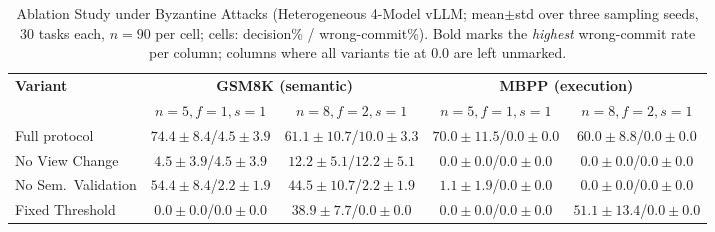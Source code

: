 \documentclass{article}
\begin{document}
\begin{table}[htbp]
\centering
\caption{Ablation Study under Byzantine Attacks (Heterogeneous 4-Model vLLM; mean$\pm$std over three sampling seeds, 30 tasks each, $n{=}90$ per cell; cells: decision\% / wrong-commit\%). Bold marks the \emph{highest} wrong-commit rate per column; columns where all variants tie at $0.0$ are left unmarked.}
\label{tab:ablation}
\setlength{\tabcolsep}{2pt}
\footnotesize
\begin{tabular}{lcccc}
\toprule
\textbf{Variant} & \multicolumn{2}{c}{\textbf{GSM8K (semantic)}} & \multicolumn{2}{c}{\textbf{MBPP (execution)}} \\
\cmidrule(lr){2-3} \cmidrule(lr){4-5}
 & $n{=}5,f{=}1,s{=}1$ & $n{=}8,f{=}2,s{=}1$ & $n{=}5,f{=}1,s{=}1$ & $n{=}8,f{=}2,s{=}1$ \\
\midrule
Full protocol & $74.4{\pm}8.4$/$\mathbf{4.5{\pm}3.9}$ & $61.1{\pm}10.7$/$10.0{\pm}3.3$ & $70.0{\pm}11.5$/$0.0{\pm}0.0$ & $60.0{\pm}8.8$/$0.0{\pm}0.0$ \\
No View Change & $4.5{\pm}3.9$/$\mathbf{4.5{\pm}3.9}$ & $12.2{\pm}5.1$/$\mathbf{12.2{\pm}5.1}$ & $0.0{\pm}0.0$/$0.0{\pm}0.0$ & $0.0{\pm}0.0$/$0.0{\pm}0.0$ \\
No Sem.\ Validation & $54.4{\pm}8.4$/$2.2{\pm}1.9$ & $44.5{\pm}10.7$/$2.2{\pm}1.9$ & $1.1{\pm}1.9$/$0.0{\pm}0.0$ & $0.0{\pm}0.0$/$0.0{\pm}0.0$ \\
Fixed Threshold & $0.0{\pm}0.0$/$0.0{\pm}0.0$ & $38.9{\pm}7.7$/$0.0{\pm}0.0$ & $0.0{\pm}0.0$/$0.0{\pm}0.0$ & $51.1{\pm}13.4$/$0.0{\pm}0.0$ \\
\bottomrule
\end{tabular}
\end{table}
\end{document}
